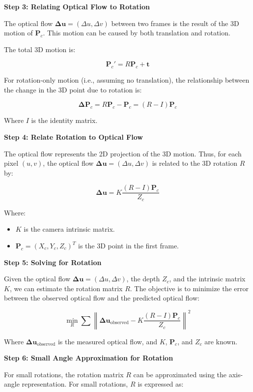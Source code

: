 \textbf{Step 3: Relating Optical Flow to Rotation}

The optical flow \( \mathbf{\Delta u} = (\Delta u, \Delta v) \) between two frames is the result of the 3D motion of \( \mathbf{P}_c \). This motion can be caused by both translation and rotation.

The total 3D motion is:

\[
\mathbf{P}_c' = R \mathbf{P}_c + \mathbf{t}
\]

For rotation-only motion (i.e., assuming no translation), the relationship between the change in the 3D point due to rotation is:

\[
\mathbf{\Delta P}_c = R \mathbf{P}_c - \mathbf{P}_c = (R - I) \mathbf{P}_c
\]

Where \( I \) is the identity matrix.

\textbf{Step 4: Relate Rotation to Optical Flow}

The optical flow represents the 2D projection of the 3D motion. Thus, for each pixel \( (u, v) \), the optical flow \( \mathbf{\Delta u} = (\Delta u, \Delta v) \) is related to the 3D rotation \( R \) by:

\[
\mathbf{\Delta u} = K \frac{(R - I) \mathbf{P}_c}{Z_c}
\]

Where:
\begin{itemize}
	\item \( K \) is the camera intrinsic matrix.
	\item \( \mathbf{P}_c = (X_c, Y_c, Z_c)^T \) is the 3D point in the first frame.
\end{itemize}

\textbf{Step 5: Solving for Rotation}

Given the optical flow \( \mathbf{\Delta u} = (\Delta u, \Delta v) \), the depth \( Z_c \), and the intrinsic matrix \( K \), we can estimate the rotation matrix \( R \). The objective is to minimize the error between the observed optical flow and the predicted optical flow:

\[
\min_R \sum \left\| \mathbf{\Delta u}_{\text{observed}} - K \frac{(R - I) \mathbf{P}_c}{Z_c} \right\|^2
\]

Where \( \mathbf{\Delta u}_{\text{observed}} \) is the measured optical flow, and \( K \), \( \mathbf{P}_c \), and \( Z_c \) are known.

\textbf{Step 6: Small Angle Approximation for Rotation}

For small rotations, the rotation matrix \( R \) can be approximated using the axis-angle representation. For small rotations, \( R \) is expressed as:

